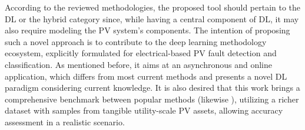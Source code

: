According to the reviewed methodologies, the proposed tool should pertain to the DL or the hybrid category since, while having a central component of DL, it may also require modeling the PV system's components. The intention of proposing such a novel approach is to contribute to the deep learning methodology ecosystem, explicitly formulated for electrical-based PV fault detection and classification. As mentioned before, it aims at an asynchronous and online application, which differs from most current methods and presents a novel DL paradigm considering current knowledge. It is also desired that this work brings a comprehensive benchmark between popular methods (likewise \cite{Aziz2020}), utilizing a richer dataset with samples from tangible utility-scale PV assets, allowing accuracy assessment in a realistic scenario.